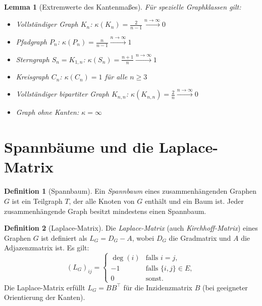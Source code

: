 ﻿\documentclass[a4paper,12pt,openany,oneside]{book}
\theoremstyle{definition}
\newtheorem{definition}{Definition}[chapter]
\theoremstyle{plain}
\newtheorem{lemma}{Lemma}[chapter]
\theoremstyle{remark}
\begin{document}
\begin{lemma}[Extremwerte des Kantenma\ss{}es]
  \label{lem:kappa-extrem}
  F\"ur spezielle Graphklassen gilt:
  \begin{itemize}
    \item Vollst\"andiger Graph $K_n$:
          $\kappa(K_n) = \frac{2}{n-1} \xrightarrow{n\to\infty} 0$
    \item Pfadgraph $P_n$:
          $\kappa(P_n) = \frac{n}{n-1} \xrightarrow{n\to\infty} 1$
    \item Sterngraph $S_n = K_{1,n}$:
          $\kappa(S_n) = \frac{n+1}{n} \xrightarrow{n\to\infty} 1$
    \item Kreisgraph $C_n$: $\kappa(C_n) = 1$ f\"ur alle $n \geq 3$
    \item Vollst\"andiger bipartiter Graph $K_{n,n}$:
          $\kappa(K_{n,n}) = \frac{2}{n} \xrightarrow{n\to\infty} 0$
    \item Graph ohne Kanten: $\kappa = \infty$
  \end{itemize}
\end{lemma}

\section{Spannb\"aume und die Laplace-Matrix}

\begin{definition}[Spannbaum]
  Ein \emph{Spannbaum} eines zusammenh\"angenden Graphen $G$ ist ein
  Teilgraph $T$, der alle Knoten von $G$ enth\"alt und ein Baum ist.
  Jeder zusammenh\"angende Graph besitzt mindestens einen Spannbaum.
\end{definition}

\begin{definition}[Laplace-Matrix]
  Die \emph{Laplace-Matrix} (auch \emph{Kirchhoff-Matrix}) eines Graphen
  $G$ ist definiert als $L_G = D_G - A$, wobei $D_G$ die Gradmatrix und
  $A$ die Adjazenzmatrix ist. Es gilt:
  \[
    (L_G)_{ij} = \begin{cases}
                   \deg(i) & \text{falls } i = j,\\
                   -1      & \text{falls } \{i,j\} \in E,\\
                   0       & \text{sonst.}
                 \end{cases}
  \]
  Die Laplace-Matrix erf\"ullt $L_G = B B^\top$ f\"ur die Inzidenzmatrix $B$
  (bei geeigneter Orientierung der Kanten).
\end{definition}
\end{document}
